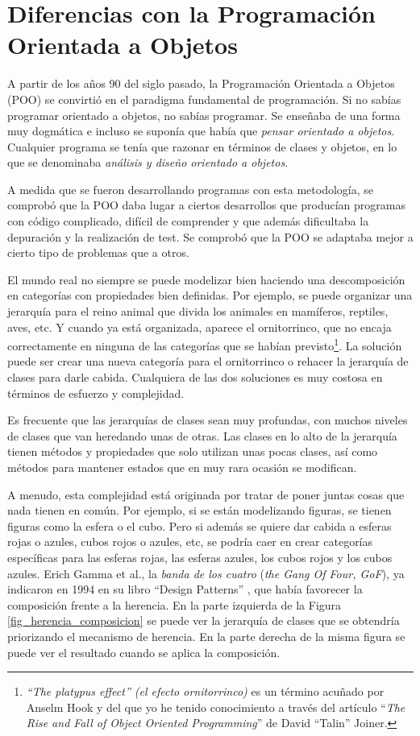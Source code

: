 \section{Diferencias con la Programación Orientada a Objetos}
A partir de los años 90 del siglo pasado, la Programación Orientada a Objetos (POO) se convirtió en el paradigma fundamental de programación. Si no sabías programar orientado a objetos, no sabías programar. Se enseñaba de una forma muy dogmática e incluso se suponía que había que \textit{pensar orientado a objetos}. Cualquier programa se tenía que razonar en términos de clases y objetos, en lo que se denominaba \textit{análisis y diseño orientado a objetos}.

A medida que se fueron desarrollando programas con esta metodología, se comprobó que la POO daba lugar a ciertos desarrollos que producían programas con código complicado, difícil de comprender y que además dificultaba la depuración y la realización de test. Se comprobó que la POO se adaptaba mejor a cierto tipo de problemas que a otros.

El mundo real no siempre se puede modelizar bien haciendo una descomposición en categorías con propiedades bien definidas. Por ejemplo, se puede organizar una jerarquía para el reino animal que divida los animales en mamíferos, reptiles, aves, etc. Y cuando ya está organizada, aparece el ornitorrinco, que no encaja correctamente en ninguna de las categorías que se habían previsto\footnote{\textit{``The platypus effect'' (el efecto ornitorrinco)} es un término acuñado por Anselm Hook y del que yo he tenido conocimiento a través del artículo ``\textit{The Rise and Fall of Object Oriented Programming}'' de David ``Talin'' Joiner.}. La solución puede ser crear una nueva categoría para el ornitorrinco o rehacer la jerarquía de clases para darle cabida. Cualquiera de las dos soluciones es muy costosa en términos de esfuerzo y complejidad.

Es frecuente que las jerarquías de clases sean muy profundas, con muchos niveles de clases que van heredando unas de otras. Las clases en lo alto de la jerarquía tienen métodos y propiedades que solo utilizan unas pocas clases, así como métodos para mantener estados que en muy rara ocasión se modifican. 

\pagebreak
A menudo, esta complejidad está originada por tratar de poner juntas cosas que nada tienen en común. Por ejemplo, si se están modelizando figuras, se tienen figuras como la esfera o el cubo. Pero si además se quiere dar cabida a esferas rojas o azules, cubos rojos o azules, etc, se podría caer en crear categorías específicas para las esferas rojas, las esferas azules, los cubos rojos y los cubos azules. Erich Gamma et al., la \textit{banda de los cuatro} (\textit{the Gang Of Four, GoF}), ya indicaron en 1994 en su libro ``Design Patterns''  \citep{gammaDesignPatternsElements1994}, que había favorecer la composición frente a la herencia. En la parte izquierda de la Figura \ref{fig_herencia_composicion} se puede ver la jerarquía de clases que se obtendría priorizando el mecanismo de herencia. En la parte derecha de la misma figura se puede ver el resultado cuando se aplica la composición. 

